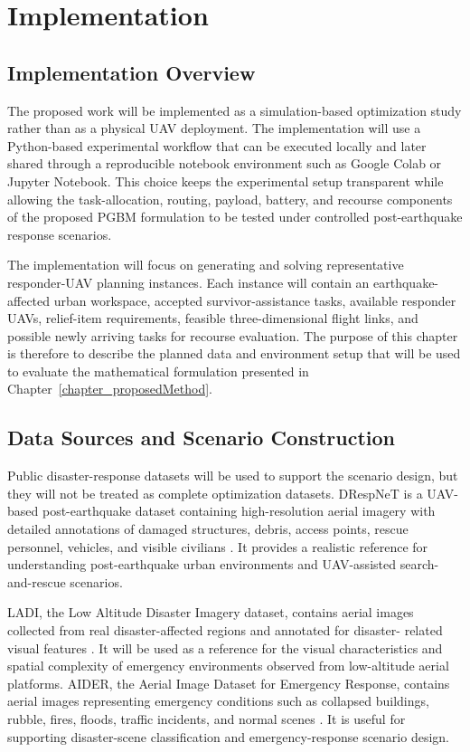 \chapter{Implementation}
\label{chapter_implementation}

\section{Implementation Overview}

The proposed work will be implemented as a simulation-based optimization
study rather than as a physical UAV deployment. The implementation will use a
Python-based experimental workflow that can be executed locally and later
shared through a reproducible notebook environment such as Google Colab or
Jupyter Notebook. This choice keeps the experimental setup transparent while
allowing the task-allocation, routing, payload, battery, and recourse
components of the proposed PGBM formulation to be tested under controlled
post-earthquake response scenarios.

The implementation will focus on generating and solving representative
responder-UAV planning instances. Each instance will contain an earthquake-
affected urban workspace, accepted survivor-assistance tasks, available
responder UAVs, relief-item requirements, feasible three-dimensional flight
links, and possible newly arriving tasks for recourse evaluation. The purpose
of this chapter is therefore to describe the planned data and environment
setup that will be used to evaluate the mathematical formulation presented in
Chapter~\ref{chapter_proposedMethod}.

\section{Data Sources and Scenario Construction}

Public disaster-response datasets will be used to support the scenario design,
but they will not be treated as complete optimization datasets. DRespNeT is a
UAV-based post-earthquake dataset containing high-resolution aerial imagery
with detailed annotations of damaged structures, debris, access points, rescue
personnel, vehicles, and visible civilians \cite{sirma2025drespnet}. It
provides a realistic reference for understanding post-earthquake urban
environments and UAV-assisted search-and-rescue scenarios.

LADI, the Low Altitude Disaster Imagery dataset, contains aerial images
collected from real disaster-affected regions and annotated for disaster-
related visual features \cite{scheele2025ladi}. It will be used as a reference
for the visual characteristics and spatial complexity of emergency
environments observed from low-altitude aerial platforms. AIDER, the Aerial
Image Dataset for Emergency Response, contains aerial images representing
emergency conditions such as collapsed buildings, rubble, fires, floods,
traffic incidents, and normal scenes \cite{kyrkou2020emergencynet}. It is
useful for supporting disaster-scene classification and emergency-response
scenario design.


